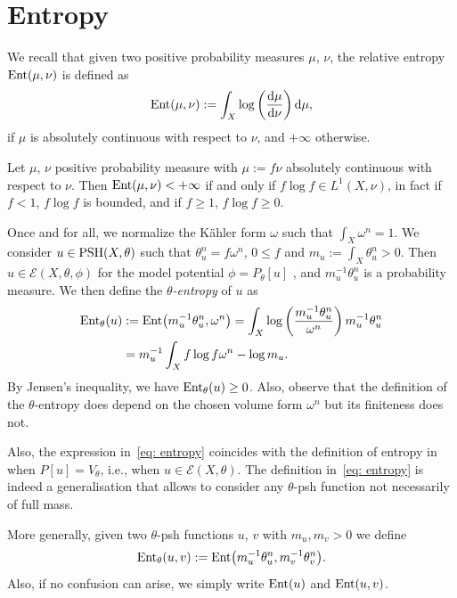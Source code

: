 \documentclass[11pt]{article}
\numberwithin{equation}{section}
\numberwithin{equation}{section}
\theoremstyle{plain}
\newcommand \psh {{\rm PSH}}
\newcommand \Ent{{\rm Ent}}
\begin{document}
\section{Entropy}
 We recall that given two positive probability measures $\mu$, $\nu$, the relative entropy $\Ent(\mu, \nu)$ is defined as
\[
\Ent(\mu, \nu) := \int_X \log\left (\frac{{\rm d}\mu}{{\rm d}\nu}\right) {\rm d}\mu,
\]
if $\mu$ is absolutely continuous with respect to $\nu$, and $+\infty$ otherwise.

\begin{Remark}
Let $\mu$, $\nu$ positive probability measure with $\mu := f \nu $ absolutely continuous with respect to $\nu$. Then $\Ent(\mu,\nu) < + \infty$ if and only if $f\log f \in L^1(X,\nu)$, in fact if $f < 1$, $f \log f$ is bounded, and if $f \geq 1$, $f \log f \geq 0$. \label{L^1}
\end{Remark}

Once and for all, we normalize the K\"ahler form $\omega$ such that $\int_X \omega^n=1$. We consider $u\in \psh(X, \theta)$ such that $\theta_u^n=f \omega^n$, $0 \leq f$ and $m_u:=\int_X \theta_u^n >0$. Then $ u\in \mathcal{E}(X, \theta, \phi)$ for the model potential $\phi=P_\theta[u]$ \cite[Theorem 1.3]{DDL2}, and $m_u^{-1}\theta_u^n$ is a probability measure. We then define the $\theta$\emph{-entropy} of $u$ as
\begin{align}
 {\rm Ent}_\theta(u)&:= {\rm Ent}\big( m_u^{-1}\theta_u^n, {\omega^n}\big)=\int_X \log \left( \frac{m_u^{-1}\theta_u^n}{\omega^n} \right) m_u^{-1}\theta_u^n\nonumber\\
 &= m_u^{-1} \int_X f\log f \omega^n-\log m_u.\label{eq: entropy}
 \end{align}
By Jensen’s inequality, we have ${\rm Ent}_\theta(u)\geq 0$. Also, observe that the definition of the $\theta$-entropy does depend on the chosen volume form $\omega^n$ but its finiteness does not.

Also, the expression in~\eqref{eq: entropy} coincides with the definition of entropy in \cite{DGL20} when $P[u]=V_\theta$, i.e., when $u\in \mathcal{E}(X, \theta)$. The definition in~\eqref{eq: entropy} is indeed a generalisation that allows to consider any $\theta$-psh function not necessarily of full mass.

More generally, given two $\theta$-psh functions $u$, $v$ with $m_u, m_v>0$ we define
\[{\rm Ent}_\theta(u,v) :={\rm Ent}\big( m_u^{-1}\theta_u^n, m_v^{-1}\theta_v^n\big). \]
Also, if no confusion can arise, we simply write ${\rm Ent} (u) $ and ${\rm Ent} (u,v) $.
\end{document}

